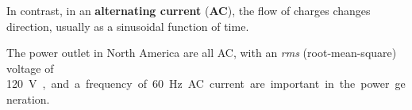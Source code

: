 
In contrast, in an \textbf{alternating current} (\textbf{AC}), the flow of
charges changes direction, usually as a sinusoidal function of time.
\begin{figure}[ht]
  \centering
  \begin{subfigure}{.3\linewidth}
    \centering  
  \end{subfigure}
  \begin{subfigure}{.3\linewidth}
    \centering
  \end{subfigure}
\end{figure}
The power outlet in North America are all AC, with an \emph{rms}
(root-mean-square) voltage of \SI{120}\volt, and a frequency of \SI{60}\hertz.
AC current are important in the power generation.




